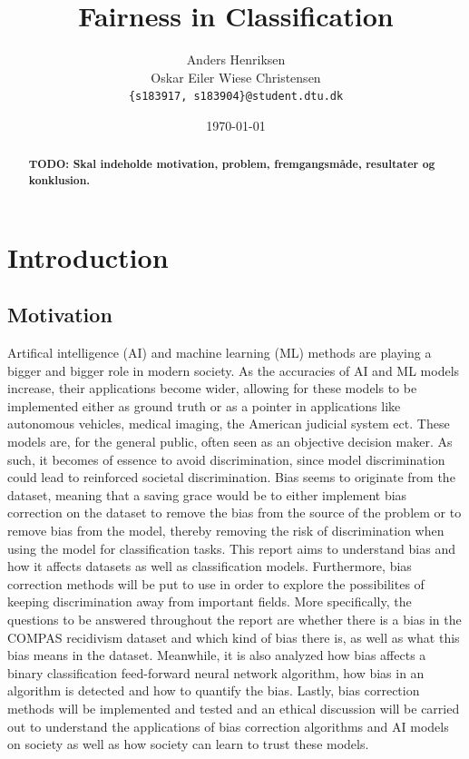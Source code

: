 \documentclass[11pt, fleqn, titlepage]{article}
\title{Fairness in Classification}
\author{Anders Henriksen \\ Oskar Eiler Wiese Christensen  \\ \texttt{\{s183917, s183904\}@student.dtu.dk}}
\date{\today}
\begin{document}
	
	\maketitle
	\begin{abstract}
		\textbf{TODO: Skal indeholde motivation, problem, fremgangsmåde, resultater og konklusion.} \\ \lipsum[1-2]
	\end{abstract}
	\tableofcontents \newpage
	
	\section{Introduction} \label{indledning}
	
	\subsection{Motivation}
	Artifical intelligence (AI) and machine learning (ML) methods are playing a bigger and bigger role in modern society. As the accuracies of AI and ML models increase, their applications become wider, allowing for these  models to be implemented either as ground truth or as a pointer in applications like autonomous vehicles, medical imaging, the American judicial system ect. These models are, for the general public, often seen as an objective decision maker. As such, it becomes of essence to avoid discrimination, since model discrimination could lead to reinforced societal discrimination. Bias seems to originate from the dataset, meaning that a saving grace would be to either implement bias correction on the dataset to remove the bias from the source of the problem or to remove bias from the model, thereby removing the risk of discrimination when using the model for classification tasks. This report aims to understand bias and how it affects datasets as well as classification models. Furthermore, bias correction methods will be put to use in order to explore the possibilites of keeping discrimination away from important fields. More specifically, the questions to be answered throughout the report are whether there is a bias in the COMPAS recidivism dataset and which kind of bias there is, as well as what this bias means in the dataset. Meanwhile, it is also analyzed how bias affects a binary classification feed-forward neural network algorithm, how bias in an algorithm is detected and how to quantify the bias. Lastly, bias correction methods will be implemented and tested and an ethical discussion will be carried out to understand the applications of bias correction algorithms and AI models on society as well as how society can learn to trust these models. \\
	
\end{document}
